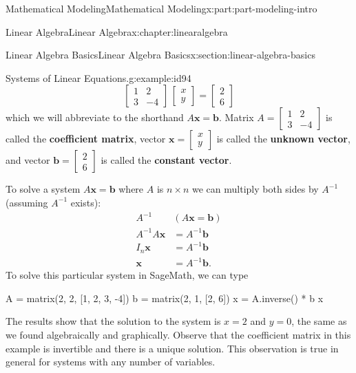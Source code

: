 \documentclass[oneside,10pt,]{book}
\newcommand{\terminology}[1]{\textbf{#1}}
\numberwithin{equation}{section}
\begin{document}
\begin{partptx}{Mathematical Modeling}{}{Mathematical Modeling}{}{}{x:part:part-modeling-intro}
\begin{chapterptx}{Linear Algebra}{}{Linear Algebra}{}{}{x:chapter:linearalgebra}
\begin{sectionptx}{Linear Algebra Basics}{}{Linear Algebra Basics}{}{}{x:section:linear-algebra-basics}
\begin{example}{Systems of Linear Equations.}{g:example:id94}
\begin{equation*}
\begin{bmatrix}
1 & 2 \\
3 & -4
\end{bmatrix}\,\begin{bmatrix}
x \\
y
\end{bmatrix} = \begin{bmatrix}
2 \\
6
\end{bmatrix}
\end{equation*}
which we will abbreviate to the shorthand \(A\mathbf{x} = \mathbf{b}\). Matrix \(A = \begin{bmatrix} 1 & 2 \\ 3 & -4 \end{bmatrix}\) is called the \terminology{coefficient matrix}, vector \(\mathbf{x} = \begin{bmatrix} x \\ y \end{bmatrix}\) is called the \terminology{unknown vector}, and vector \(\mathbf{b} = \begin{bmatrix} 2 \\ 6 \end{bmatrix}\) is called the \terminology{constant vector}.%
\par
To solve a system \(A\mathbf{x} = \mathbf{b}\) where \(A\) is \(n\times n\) we can multiply both sides by \(A^{-1}\) (assuming \(A^{-1}\) exists):%
%
\begin{equation*}
\begin{aligned}
A^{-1}&(A\mathbf{x} = \mathbf{b}) \\
A^{-1}A\mathbf{x} &= A^{-1}\mathbf{b} \\
I_n\mathbf{x} &= A^{-1}\mathbf{b} \\
\mathbf{x} &= A^{-1}\mathbf{b}.
\end{aligned}
\end{equation*}
To solve this particular system in SageMath, we can type%
\begin{sageinput}
A = matrix(2, 2, [1, 2, 3, -4])
b = matrix(2, 1, [2, 6])
x = A.inverse() * b
x
\end{sageinput}
\begin{sageoutput}
[2]
[0]
\end{sageoutput}
The results show that the solution to the system is \(x=2\) and \(y=0\), the same as we found algebraically and graphically. Observe that the coefficient matrix in this example is invertible and there is a unique solution. This observation is true in general for systems with any number of variables.%

\end{example}
\end{sectionptx}
\end{chapterptx}
\end{partptx}
\end{document}
